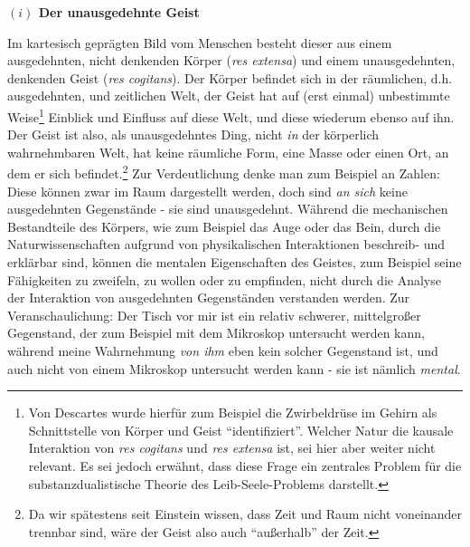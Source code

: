 \documentclass[a4paper, 12pt]{article}
\begin{document}
\begin{onehalfspace}

\vspace{5mm}
\noindent\textbf{$(i)$ Der unausgedehnte Geist}


\noindent Im kartesisch geprägten Bild vom Menschen besteht dieser aus einem ausgedehnten, nicht denkenden Körper (\emph{res extensa}) und einem unausgedehnten, denkenden Geist (\emph{res cogitans}). Der Körper befindet sich in der räumlichen, d.h. ausgedehnten, und zeitlichen Welt, der Geist hat auf (erst einmal) unbestimmte Weise\footnote{Von Descartes wurde hierfür zum Beispiel die Zwirbeldrüse im Gehirn als Schnittstelle von Körper und Geist "`identifiziert"'. Welcher Natur die kausale Interaktion von \emph{res cogitans} und \emph{res extensa} ist, sei hier aber weiter nicht relevant. Es sei jedoch erwähnt, dass diese Frage ein zentrales Problem für die substanzdualistische Theorie des Leib-Seele-Problems darstellt.} Einblick und Einfluss auf diese Welt, und diese wiederum ebenso auf ihn. Der Geist ist also, als unausgedehntes Ding, nicht \emph{in} der körperlich wahrnehmbaren Welt, hat keine räumliche Form, eine Masse oder einen Ort, an dem er sich befindet.\footnote{Da wir spätestens seit Einstein wissen, dass Zeit und Raum nicht voneinander trennbar sind, wäre der Geist also auch "`außerhalb"' der Zeit.} Zur Verdeutlichung denke man zum Beispiel an Zahlen: Diese können zwar im Raum dargestellt werden, doch sind \emph{an sich} keine ausgedehnten Gegenstände - sie sind unausgedehnt. Während die mechanischen Bestandteile des Körpers, wie zum Beispiel das Auge oder das Bein, durch die Naturwissenschaften aufgrund von physikalischen Interaktionen beschreib- und erklärbar sind, können die mentalen Eigenschaften des Geistes, zum Beispiel seine Fähigkeiten zu zweifeln, zu wollen oder zu empfinden, nicht durch die Analyse der Interaktion von ausgedehnten Gegenständen verstanden werden. Zur Veranschaulichung: Der Tisch vor mir ist ein relativ schwerer, mittelgroßer Gegenstand, der zum Beispiel mit dem Mikroskop untersucht werden kann, während meine Wahrnehmung \emph{von ihm} eben kein solcher Gegenstand ist, und auch nicht von einem Mikroskop untersucht werden kann - sie ist nämlich \emph{mental}. 


\end{onehalfspace}
\end{document}
